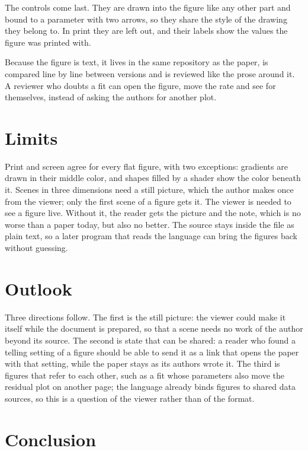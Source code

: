 \documentclass[10pt,twocolumn]{article}
\begin{document}
The controls come last. They are drawn into the figure like any other part and bound to a parameter with two arrows, so they share the
style of the drawing they belong to. In print they are left out, and their labels show the values the figure was printed with.

Because the figure is text, it lives in the same repository as the paper, is compared line by line between versions and is reviewed
like the prose around it. A reviewer who doubts a fit can open the figure, move the rate and see for themselves, instead of asking the
authors for another plot.

\section{Limits}

Print and screen agree for every flat figure, with two exceptions: gradients are drawn in their middle color, and shapes filled by a
shader show the color beneath it. Scenes in three dimensions need a still picture, which the author makes once from the viewer; only
the first scene of a figure gets it. The viewer is needed to see a figure live. Without it, the reader gets the picture and the note,
which is no worse than a paper today, but also no better. The source stays inside the file as plain text, so a later program that reads
the language can bring the figures back without guessing.

\section{Outlook}

Three directions follow. The first is the still picture: the viewer could make it itself while the document is prepared, so that a
scene needs no work of the author beyond its source. The second is state that can be shared: a reader who found a telling setting of a
figure should be able to send it as a link that opens the paper with that setting, while the paper stays as its authors wrote it. The
third is figures that refer to each other, such as a fit whose parameters also move the residual plot on another page; the language
already binds figures to shared data sources, so this is a question of the viewer rather than of the format.

\section{Conclusion}
\end{document}
